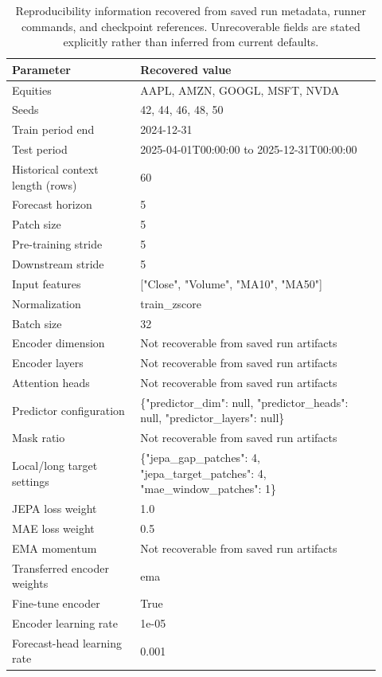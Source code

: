 \begin{table}[p]
\centering
\small
\caption{Reproducibility information recovered from saved run metadata, runner commands, and checkpoint references. Unrecoverable fields are stated explicitly rather than inferred from current defaults.}
\label{tab:reproducibility}
\begin{tabular}{p{0.32\linewidth}p{0.60\linewidth}}
\toprule
Parameter & Recovered value \\
\midrule
Equities & AAPL, AMZN, GOOGL, MSFT, NVDA \\
Seeds & 42, 44, 46, 48, 50 \\
Train period end & 2024-12-31 \\
Test period & 2025-04-01T00:00:00 to 2025-12-31T00:00:00 \\
Historical context length (rows) & 60 \\
Forecast horizon & 5 \\
Patch size & 5 \\
Pre-training stride & 5 \\
Downstream stride & 5 \\
Input features & ["Close", "Volume", "MA10", "MA50"] \\
Normalization & train\_zscore \\
Batch size & 32 \\
Encoder dimension & Not recoverable from saved run artifacts \\
Encoder layers & Not recoverable from saved run artifacts \\
Attention heads & Not recoverable from saved run artifacts \\
Predictor configuration & \{"predictor\_dim": null, "predictor\_heads": null, "predictor\_layers": null\} \\
Mask ratio & Not recoverable from saved run artifacts \\
Local/long target settings & \{"jepa\_gap\_patches": 4, "jepa\_target\_patches": 4, "mae\_window\_patches": 1\} \\
JEPA loss weight & 1.0 \\
MAE loss weight & 0.5 \\
EMA momentum & Not recoverable from saved run artifacts \\
Transferred encoder weights & ema \\
Fine-tune encoder & True \\
Encoder learning rate & 1e-05 \\
Forecast-head learning rate & 0.001 \\

\end{tabular}
\end{table}
